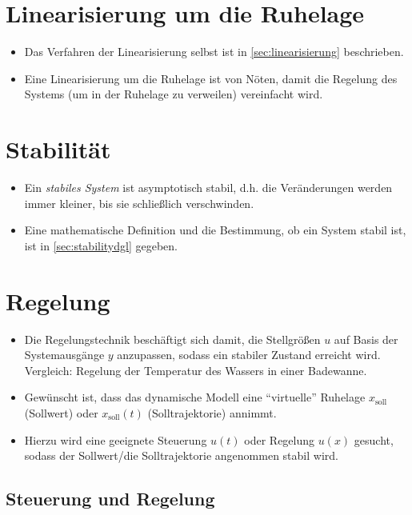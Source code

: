 	\section{Linearisierung um die Ruhelage} %
		\begin{itemize}
			\item Das Verfahren der Linearisierung selbst ist in \ref{sec:linearisierung} beschrieben.
			\item Eine Linearisierung um die Ruhelage ist von Nöten, damit die Regelung des Systems (um in der Ruhelage zu verweilen) vereinfacht wird.
		\end{itemize}

	\section{Stabilität} %
		\begin{itemize}
			\item Ein \textit{stabiles System} ist asymptotisch stabil, d.h. die Veränderungen werden immer kleiner, bis sie schließlich verschwinden.
			\item Eine mathematische Definition und die Bestimmung, ob ein System stabil ist, ist in \ref{sec:stabilitydgl} gegeben.
		\end{itemize}

	\section{Regelung} %
		\begin{itemize}
			\item Die Regelungstechnik beschäftigt sich damit, die Stellgrößen \(u\) auf Basis der Systemausgänge \(y\) anzupassen, sodass ein stabiler Zustand erreicht wird. \\ Vergleich: Regelung der Temperatur des Wassers in einer Badewanne.
			\item Gewünscht ist, dass das dynamische Modell eine \enquote{virtuelle} Ruhelage \(x_\text{soll}\) (Sollwert) oder \(x_\text{soll} (t)\) (Solltrajektorie) annimmt.
			\item Hierzu wird eine geeignete Steuerung \(u(t)\) oder Regelung \(u(x)\) gesucht, sodass der Sollwert/die Solltrajektorie angenommen stabil wird.
		\end{itemize}

		\subsection{Steuerung und Regelung} %

